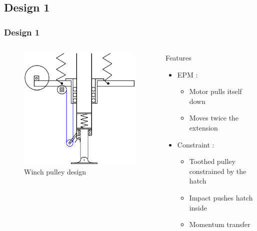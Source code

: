 \subsection*{Design 1}
\begin{frame}
\frametitle{Design 1}
\begin{columns}

\begin{figure}
\centering
\includegraphics[width=\textwidth]{fig/pratik_des.pdf}
\caption{Winch pulley design}
\end{figure}

\begin{block}{Features}
\begin{itemize}
\item
{\greencol EPM :}\\[0.1in]
    \begin{itemize}
    \item
    Motor pulls itself down\\[0.1in]
    \item
    Moves twice the extension\\[0.1in]
    \end{itemize}
\item
{\greencol Constraint :}\\[0.1in]
    \begin{itemize}
    \item
    Toothed pulley constrained by the hatch\\[0.1in]
    \item
    Impact pushes hatch inside\\[0.1in]
    \item
    Momentum transfer\\[0.1in]
    \end{itemize}
\end{itemize}
\end{block}


\end{columns}
\end{frame}
